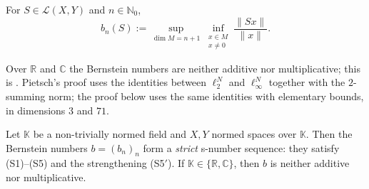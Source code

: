 \begin{definition}
\label{def:bernstein-number}
\leanok
For $S \in \mathcal{L}(X, Y)$ and $n \in \mathbb{N}_0$,
\[
b_n(S) := \sup_{\dim M = n+1}
            \inf_{\substack{x \in M \\ x \neq 0}} \frac{\|Sx\|}{\|x\|}.
\]
\end{definition}

Over $\mathbb{R}$ and $\mathbb{C}$ the Bernstein numbers are neither
additive nor multiplicative; this is \cite[Theorem~3]{Pietsch08}. Pietsch's
proof uses the identities between
$\ell_2^N$ and $\ell_\infty^N$ together with the $2$-summing norm; the
proof below uses the same identities with elementary bounds, in dimensions
$3$ and $71$.

\begin{theorem}
\label{thm:bernstein-is-snumber}
\leanok
{}
Let $\mathbb{K}$ be a non-trivially normed field and $X, Y$ normed spaces
over $\mathbb{K}$. Then the Bernstein numbers $b = (b_n)_n$ form a
\emph{strict} s-number sequence: they satisfy (S1)--(S5) and the
strengthening (S5$'$). If $\mathbb{K} \in \{\mathbb{R}, \mathbb{C}\}$, then
$b$ is neither additive nor multiplicative.
\end{theorem}
